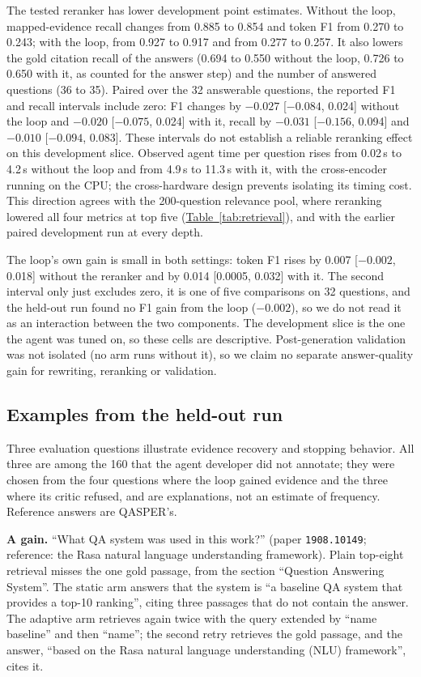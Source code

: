 The tested reranker has lower development point estimates. Without the loop, mapped-evidence recall changes from 0.885 to 0.854 and token F1 from 0.270 to 0.243; with the loop, from 0.927 to 0.917 and from 0.277 to 0.257. It also lowers the gold citation recall of the answers (0.694 to 0.550 without the loop, 0.726 to 0.650 with it, as counted for the answer step) and the number of answered questions (36 to 35). Paired over the 32 answerable questions, the reported F1 and recall intervals include zero: F1 changes by $-0.027$ [$-0.084$, 0.024] without the loop and $-0.020$ [$-0.075$, 0.024] with it, recall by $-0.031$ [$-0.156$, 0.094] and $-0.010$ [$-0.094$, 0.083]. These intervals do not establish a reliable reranking effect on this development slice. Observed agent time per question rises from 0.02\,s to 4.2\,s without the loop and from 4.9\,s to 11.3\,s with it, with the cross-encoder running on the CPU; the cross-hardware design prevents isolating its timing cost. This direction agrees with the 200-question relevance pool, where reranking lowered all four metrics at top five (\hyperref[tab:retrieval]{Table~\ref*{tab:retrieval}}), and with the earlier paired development run at every depth.

The loop's own gain is small in both settings: token F1 rises by 0.007 [$-0.002$, 0.018] without the reranker and by 0.014 [0.0005, 0.032] with it. The second interval only just excludes zero, it is one of five comparisons on 32 questions, and the held-out run found no F1 gain from the loop ($-0.002$), so we do not read it as an interaction between the two components. The development slice is the one the agent was tuned on, so these cells are descriptive. Post-generation validation was not isolated (no arm runs without it), so we claim no separate answer-quality gain for rewriting, reranking or validation.
\subsection{Examples from the held-out run}
Three evaluation questions illustrate evidence recovery and stopping behavior. All three are among the 160 that the agent developer did not annotate; they were chosen from the four questions where the loop gained evidence and the three where its critic refused, and are explanations, not an estimate of frequency. Reference answers are QASPER's.

\textbf{A gain.} ``What QA system was used in this work?'' (paper \texttt{1908.10149}; reference: the Rasa natural language understanding framework). Plain top-eight retrieval misses the one gold passage, from the section ``Question Answering System''. The static arm answers that the system is ``a baseline QA system that provides a top-10 ranking'', citing three passages that do not contain the answer. The adaptive arm retrieves again twice with the query extended by ``name baseline'' and then ``name''; the second retry retrieves the gold passage, and the answer, ``based on the Rasa natural language understanding (NLU) framework'', cites it.

